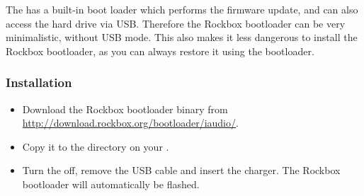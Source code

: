 
The \playername{} has a built-in boot loader which performs the
firmware update, and can also access the hard drive via USB. Therefore the
Rockbox bootloader can be very minimalistic, without USB mode.
This also makes it less dangerous to install the Rockbox bootloader, as you can
always restore it using the \playerman{} bootloader.


\subsubsection{Installation}
\begin{itemize}
\item Download the Rockbox bootloader binary from 
\url{http://download.rockbox.org/bootloader/iaudio/}.
\item Copy it to the  directory on your \dap{}.
\item Turn the \dap{} off, remove the USB cable and insert the charger. The
Rockbox bootloader will automatically be flashed.
\end{itemize}

